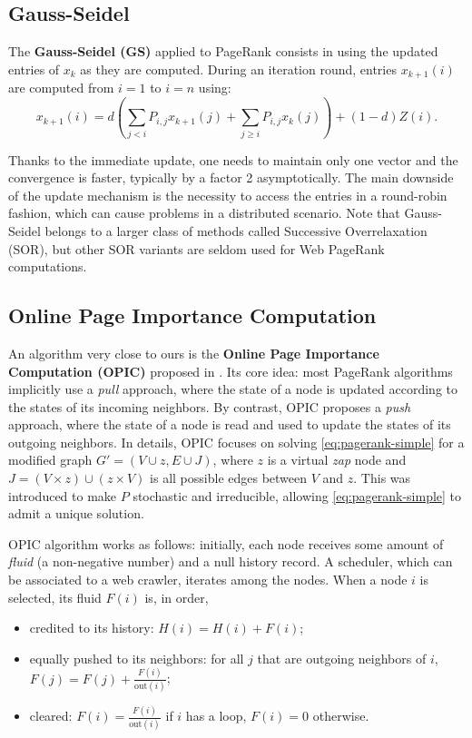 \documentclass{llncs}
\begin{document}
\subsection{Gauss-Seidel}

The \textbf{Gauss-Seidel (GS)} applied to PageRank consists in using the updated entries of $ x_k $ as they are computed. During an iteration round, entries $ x_{k+1}(i) $ are computed from $ i=1 $ to $ i=n $ using:
\begin{equation}
x_{k+1}(i)=d\left(\sum_{j<i} P_{i,j}x_{k+1}(j)+\sum_{j\geq i} P_{i,j}x_k(j) \right)+(1-d)Z(i)\text{.}
\end{equation}

Thanks to the immediate update, one needs to maintain only one vector and the convergence is faster, typically by a factor 2 asymptotically. The main downside of the update mechanism is the necessity to access the entries in a round-robin fashion, which can cause problems in a distributed scenario.
Note that Gauss-Seidel belongs to a larger class of methods called Successive Overrelaxation (SOR), but other SOR variants are seldom used for Web PageRank computations\cite{SOR}.




\subsection{Online Page Importance Computation}
\label{sec:opic}

An algorithm very close to ours is the \textbf{Online Page Importance Computation (OPIC)} proposed in \cite{AP03}. Its core idea: most PageRank algorithms implicitly use a \emph{pull} approach, where the state of a node is updated according to the states of its incoming neighbors. By contrast, OPIC proposes a \emph{push} approach, where the state of a node is read and used to update the states of its outgoing neighbors. In details, OPIC focuses on solving \eqref{eq:pagerank-simple} for a modified graph $ G'=(V\cup z,E\cup J) $, where $ z $ is a virtual \emph{zap} node and $ J=\left(V\times z\right) \cup \left(z\times V\right) $ is all possible edges between $ V $ and $ z $. This was introduced to make $ P $ stochastic and irreducible, allowing \eqref{eq:pagerank-simple} to admit a unique solution.

OPIC algorithm works as follows: initially, each node receives some amount of \emph{fluid} (a non-negative number) and a null history record. A scheduler, which can be associated to a web crawler, iterates among the nodes. When a node $ i $ is selected, its fluid $ F(i) $ is, in order,
\begin{itemize}
\item credited to its history: $ H(i)=H(i)+F(i) $;
\item equally pushed to its neighbors: for all $ j $ that are outgoing neighbors of $ i $, $ F(j)=F(j)+\frac{F(i)}{\textrm{out}(i)} $;
\item cleared: $ F(i)=\frac{F(i)}{\textrm{out}(i)} $ if $ i $ has a loop, $ F(i)=0 $ otherwise.
\end{itemize}
\end{document}
